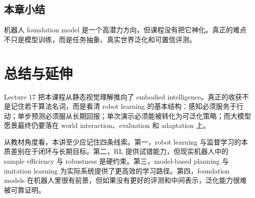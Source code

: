 \documentclass[a4paper]{article}
\begin{document}
    \subsection{本章小结}

    机器人 foundation model 是一个高潜力方向，但课程没有把它神化。真正的难点不只是模型训练，而是任务抽象、真实世界泛化和可置信评测。

    \section{总结与延伸}

    Lecture 17 把本课程从静态视觉理解推向了 embodied intelligence。真正的收获不是记住若干算法名词，而是看清 robot learning 的基本结构：感知必须服务于行动；单步预测必须服从长期回报；单次演示必须能被转化为可泛化策略；而大模型愿景最终仍要落在 world interaction、evaluation 和 adaptation 上。

    从教材角度看，本讲至少应记住四条线索。第一，robot learning 与监督学习的本质差别在于闭环与长期目标。第二，RL 提供试错能力，但现实机器人中的 sample efficiency 与 robustness 是硬约束。第三，model-based planning 与 imitation learning 为实际系统提供了更高效的学习路径。第四，foundation models 在机器人里很有前景，但如果没有更好的评测和中间表示，泛化能力很难被可靠证明。
\end{document}
